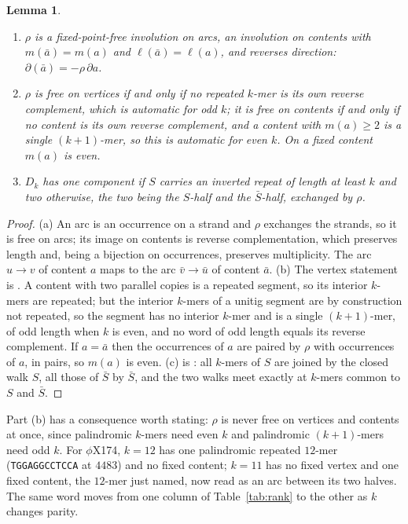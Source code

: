 \documentclass[11pt]{article}
\theoremstyle{plain}
\newtheorem{lemma}[theorem]{Lemma}
\theoremstyle{definition}
\theoremstyle{remark}
\begin{document}
\begin{lemma}\label{lem:rho}
\begin{enumerate}
\item[\rm(a)] $\rho$ is a fixed-point-free involution on arcs, an involution on contents with
$m(\bar a)=m(a)$ and $\ell(\bar a)=\ell(a)$, and reverses direction:
$\partial(\bar a)=-\rho\,\partial a$.
\item[\rm(b)] $\rho$ is free on vertices if and only if no repeated $k$-mer is its own
reverse complement, which is automatic for odd $k$; it is free on contents if and only if no
content is its own reverse complement, and a content with $m(a)\ge2$ is a single
$(k{+}1)$-mer, so this is automatic for even $k$. On a fixed content $m(a)$ is even.
\item[\rm(c)] $D_k$ has one component if $S$ carries an inverted repeat of length at least
$k$ and two otherwise, the two being the $S$-half and the $\bar S$-half, exchanged by $\rho$.
\end{enumerate}
\end{lemma}

\begin{proof}
(a) An arc is an occurrence on a strand and $\rho$ exchanges the strands, so it is free on
arcs; its image on contents is reverse complementation, which preserves length and, being a
bijection on occurrences, preserves multiplicity. The arc $u\to v$ of content $a$ maps to the
arc $\bar v\to\bar u$ of content $\bar a$.
(b) The vertex statement is \cite[Prop.~2]{Bio7}. A content with two parallel copies is a
repeated segment, so its interior $k$-mers are repeated; but the interior $k$-mers of a
unitig segment are by construction not repeated, so the segment has no interior $k$-mer and
is a single $(k{+}1)$-mer, of odd length when $k$ is even, and no word of odd length equals
its reverse complement. If $a=\bar a$ then the occurrences of $a$ are paired by $\rho$ with
occurrences of $a$, in pairs, so $m(a)$ is even.
(c) is \cite[Thm.~3]{Bio6}: all $k$-mers of $S$ are joined by the closed walk $S$, all those of
$\bar S$ by $\bar S$, and the two walks meet exactly at $k$-mers common to $S$ and $\bar S$.
\end{proof}

Part (b) has a consequence worth stating: $\rho$ is never free on vertices and contents at
once, since palindromic $k$-mers need even $k$ and palindromic $(k{+}1)$-mers need odd $k$.
For $\phi$X174, $k=12$ has one palindromic repeated $12$-mer (\texttt{TGGAGGCCTCCA} at
$4483$) and no fixed content; $k=11$ has no fixed vertex and one fixed content, the $12$-mer
just named, now read as an arc between its two halves. The same word moves from one column
of Table~\ref{tab:rank} to the other as $k$ changes parity.
\end{document}
